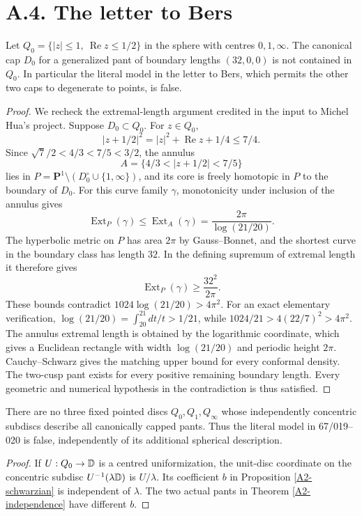 \section{A.4. The letter to Bers}
\begin{proposition}\label{A4-orange-extremal}
Let $Q_0=\{|z|\leq1,\ \operatorname{Re}z\leq1/2\}$ in the sphere with centres $0,1,\infty$. The canonical cap $D_0$ for a generalized pant of boundary lengths $(32,0,0)$ is not contained in $Q_0$. In particular the literal model in the letter to Bers, which permits the other two caps to degenerate to points, is false.
\end{proposition}
\begin{proof}
We recheck the extremal-length argument credited in the input to Michel Hua's project. Suppose $D_0\subset Q_0$. For $z\in Q_0$,
\[
 |z+1/2|^2=|z|^2+\operatorname{Re}z+1/4\leq7/4.
\]
Since $\sqrt7/2<4/3<7/5<3/2$, the annulus
\[
 A=\{4/3<|z+1/2|<7/5\}
\]
lies in $P=\mathbf P^1\setminus(D_0^\circ\cup\{1,\infty\})$, and its core is freely homotopic in $P$ to the boundary of $D_0$. For this curve family $\gamma$, monotonicity under inclusion of the annulus gives
\[
\operatorname{Ext}_P(\gamma)\leq\operatorname{Ext}_A(\gamma)
=\frac{2\pi}{\log(21/20)}.
\]
The hyperbolic metric on $P$ has area $2\pi$ by Gauss--Bonnet, and the shortest curve in the boundary class has length $32$. In the defining supremum of extremal length it therefore gives
\[
\operatorname{Ext}_P(\gamma)\geq\frac{32^2}{2\pi}.
\]
These bounds contradict $1024\log(21/20)>4\pi^2$. For an exact elementary verification, $\log(21/20)=\int_{20}^{21}dt/t>1/21$, while $1024/21>4(22/7)^2>4\pi^2$. The annulus extremal length is obtained by the logarithmic coordinate, which gives a Euclidean rectangle with width $\log(21/20)$ and periodic height $2\pi$. Cauchy--Schwarz gives the matching upper bound for every conformal density. The two-cusp pant exists for every positive remaining boundary length. Every geometric and numerical hypothesis in the contradiction is thus satisfied.
\end{proof}

\begin{corollary}\label{A4-orange-jets}
There are no three fixed pointed discs $Q_0,Q_1,Q_\infty$ whose independently concentric subdiscs describe all canonically capped pants. Thus the literal model in 67/019--020 is false, independently of its additional spherical description.
\end{corollary}
\begin{proof}
If $U:Q_0\to{\ensuremath{\mathbb{D}}}$ is a centred uniformization, the unit-disc coordinate on the concentric subdisc $U^{-1}(\lambda{\ensuremath{\mathbb{D}}})$ is $U/\lambda$. Its coefficient $b$ in Proposition \ref{A2-schwarzian} is independent of $\lambda$. The two actual pants in Theorem \ref{A2-independence} have different $b$.
\end{proof}

